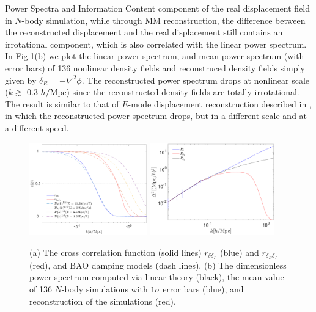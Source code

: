 \begin{section}{Power Spectra and Information Content}
  component of the real displacement field in $N$-body simulation,
  while through MM reconstruction, the difference between the
  reconstructed displacement and the real displacement still contains
  an irrotational component, which is also correlated with the linear
  power spectrum.  In Fig.\ref{fig:cp}(b) we plot the linear power
  spectrum, and mean power spectrum (with error bars) of 136 nonlinear
  density fields and reconstruced density fields simply given by
  $\delta_R=-\nabla^2\phi$.  The reconstructed power spectrum drops at
  nonlinear scale ($k \gtrsim$ 0.3 $h/\mathrm{Mpc}$) since the
  reconstructed density fields are totally irrotational.  The result
  is similar to that of $E$-mode displacement reconstruction described
  in \cite{bib:Yu2016}, in which the reconstructed power spectrum
  drops, but in a different scale and at a different speed.
  \begin{figure}
    \centering
    \includegraphics[width=0.455\textwidth]{fig2a.pdf}
    \includegraphics[width=0.48\textwidth]{fig2b.pdf}
    \caption{(a) The cross correlation function (solid lines)
      $r_{\delta\delta_L}$ (blue) and $r_{\delta_R\delta_L}$ (red),
      and BAO damping models (dash lines).  (b) The dimensionless
      power spectrum computed via linear theory (black), the mean
      value of 136 $N$-body simulations with $1\sigma$ error bars
      (blue), and reconstruction of the simulations (red).}
    \label{fig:cp}
  \end{figure}


\end{section}
